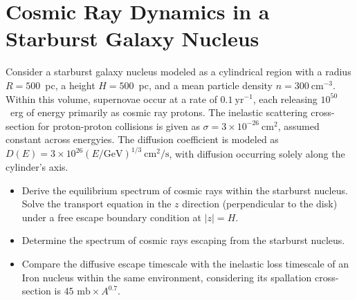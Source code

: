 \section{Cosmic Ray Dynamics in a Starburst Galaxy Nucleus}

Consider a starburst galaxy nucleus modeled as a cylindrical region with a radius \(R = 500\)~pc, a height \(H = 500\)~pc, and a mean particle density \(n = 300~\text{cm}^{-3}\). Within this volume, supernovae occur at a rate of \(0.1~\text{yr}^{-1}\), each releasing \(10^{50}\)~erg of energy primarily as cosmic ray protons. The inelastic scattering cross-section for proton-proton collisions is given as \(\sigma = 3 \times 10^{-26}~\text{cm}^2\), assumed constant across energyies. The diffusion coefficient is modeled as \(D(E) = 3 \times 10^{26} (E/\text{GeV})^{1/3}~\text{cm}^2/\text{s}\), with diffusion occurring solely along the cylinder's axis.

\begin{itemize}
\item Derive the equilibrium spectrum of cosmic rays within the starburst nucleus. Solve the transport equation in the \(z\) direction (perpendicular to the disk) under a free escape boundary condition at \(|z| = H\). 
\item Determine the spectrum of cosmic rays escaping from the starburst nucleus. 
\item Compare the diffusive escape timescale with the inelastic loss timescale of an Iron nucleus within the same environment, considering its spallation cross-section is \(45 \text{ mb} \times A^{0.7}\). 
\end{itemize}
